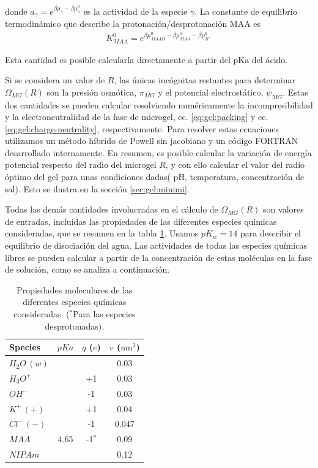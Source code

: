 \noindent donde $a_\gamma = e^{\beta\mu_\gamma-\beta\mu_\gamma^0}$ es la actividad de la especie $\gamma$. 
La constante de equilibrio termodin\'amico que describe la protonaci\'on/desprotonaci\'on MAA es
%
%
\begin{align}
K^0_{MAA}= e^{\beta\mu^0_{MAAH}-\beta\mu^0_{MAA}-\beta\mu^0_{H^+}}
\end{align}

\noindent Esta cantidad es posible calcularla directamente a partir del pKa del \'acido.


Si se considera  un valor de  $R$, las \'unicas inc\'ognitas restantes para determinar $\Omega_{MG}(R)$ son la presi\'on osm\'otica, $\pi_{MG}$ y el potencial electrost\'atico, $\psi_{MG}$.
Estas dos cantidades se pueden calcular resolviendo num\'ericamente la incompresibilidad y la electroneutralidad de la fase de microgel, ec. \ref{eq:gel:packing} y ec. \ref{eq:gel:charge-neutrality}, respectivamente.
Para resolver estas ecuaciones utilizamos un m\'etodo h\'ibrido de Powell sin jacobiano y un c\'odigo FORTRAN desarrollado internamente.
En resumen, es posible calcular la variaci\'on de energ\'ia potencial respecto del radio del microgel $R$, y con ello calcular el valor del radio \'optimo del gel para unas condiciones dadas( pH, temperatura, concentraci\'on de sal). Esto se ilustra en la secci\'on \ref{sec:gel:minimi}.

Todas las dem\'as cantidades involucradas en el c\'alculo de $\Omega_{MG}(R)$ son valores de  entradas, incluidas las propiedades de las diferentes especies qu\'imicas consideradas, que se resumen en la tabla \ref{table:gel:molecules}.
Usamos $pK_w=14$ para describir el equilibrio de disociaci\'on del agua.
Las actividades de todas las especies qu\'imicas libres se pueden calcular a partir de la concentraci\'on de estas mol\'eculas en la fase de soluci\'on, como se analiza a continuaci\'on.


\begin{table}
	\centering
\begin{tabular}{|lccc|}
    \hline
    {Species} & {$pKa$} & {$q$ ($e$)} & {$v$ ($\text{nm}^3$)} \\
      \hline
$H_2O\,(w)$ & ~ & ~ & 0.03\\
$H_3O^+$ & ~ & +1 & 0.03\\
$OH^-$ & ~ & -1 & 0.03\\
$K^+\,(+)$ & ~ & +1 & 0.04\\ 
$Cl^-\,(-)$ & ~ & -1 & 0.047\\
$MAA$ & 4.65 & -1$^\ast$ & 0.09\\
$NIPAm$ & ~ & ~ & 0.12\\
    \hline
  \end{tabular}
 \caption{Propiedades moleculares de las diferentes especies qu\'imicas consideradas.
 	\footnotesize ($^\ast$Para las especies desprotonadas).}
\label{table:gel:molecules} 
\end{table}


